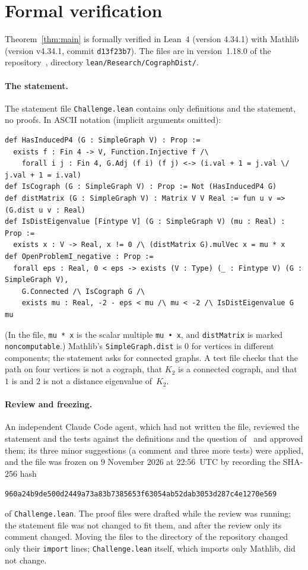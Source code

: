 \documentclass[11pt]{article}
\theoremstyle{remark}
\newcommand{\repoversion}{1.18.0}
\begin{document}
\section{Formal verification}\label{sec:lean}

Theorem~\ref{thm:main} is formally verified in Lean~4 (version 4.34.1) with
Mathlib~\cite{mathlib} (version v4.34.1, commit \texttt{d13f23b7}). The files
are in version~\repoversion{} of the repository~\cite{repo}, directory
\texttt{lean/\allowbreak Research/\allowbreak CographDist/}.

\paragraph{The statement.}
The statement file \texttt{Challenge.lean} contains only definitions and the
statement, no proofs. In ASCII notation (implicit arguments omitted):
{\footnotesize
\begin{verbatim}
def HasInducedP4 (G : SimpleGraph V) : Prop :=
  exists f : Fin 4 -> V, Function.Injective f /\
    forall i j : Fin 4, G.Adj (f i) (f j) <-> (i.val + 1 = j.val \/ j.val + 1 = i.val)
def IsCograph (G : SimpleGraph V) : Prop := Not (HasInducedP4 G)
def distMatrix (G : SimpleGraph V) : Matrix V V Real := fun u v => (G.dist u v : Real)
def IsDistEigenvalue [Fintype V] (G : SimpleGraph V) (mu : Real) : Prop :=
  exists x : V -> Real, x != 0 /\ (distMatrix G).mulVec x = mu * x
def OpenProblemI_negative : Prop :=
  forall eps : Real, 0 < eps -> exists (V : Type) (_ : Fintype V) (G : SimpleGraph V),
    G.Connected /\ IsCograph G /\
    exists mu : Real, -2 - eps < mu /\ mu < -2 /\ IsDistEigenvalue G mu
\end{verbatim}}
\noindent (In the file, \texttt{mu * x} is the scalar multiple
\texttt{mu • x}, and \texttt{distMatrix} is marked \texttt{noncomputable}.) Mathlib's \texttt{SimpleGraph.dist} is $0$ for vertices in
different components; the statement asks for connected graphs. A test file
checks that the path on four vertices is not a cograph, that $K_2$ is a
connected cograph, and that $1$ is and $2$ is not a distance eigenvalue
of~$K_2$.

\paragraph{Review and freezing.}
An independent Claude Code agent, which had not written the file, reviewed the
statement and the tests against the definitions and the question
of~\cite{mmt} and approved them; its three minor suggestions (a comment and
three more tests) were applied, and the file was frozen on 9 November 2026 at
22:56~UTC by recording the SHA-256 hash
\begin{center}\small
\texttt{960a24b9de500d2449a73a83b7385653f63054ab52dab3053d287c4e1270e569}
\end{center}
of \texttt{Challenge.lean}. The proof files were drafted while the review was
running; the statement file was not changed to fit them, and after the review
only its comment changed. Moving the files to the directory of the repository
changed only their \texttt{import} lines; \texttt{Challenge.lean} itself,
which imports only Mathlib, did not change.
\end{document}
